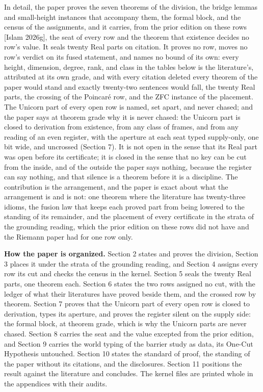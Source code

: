 \documentclass[10pt]{article}
\begin{document}
In detail, the paper proves the seven theorems of the division, the
bridge lemmas and small-height instances that accompany them, the formal
block, and the census of the assignments, and it carries, from the prior
edition on these rows {[}Islam 2026g{]}, the seat of every row and the
theorem that existence decides no row's value. It seals twenty Real
parts on citation. It proves no row, moves no row's verdict on its fused
statement, and names no bound of its own: every height, dimension,
degree, rank, and class in the tables below is the literature's,
attributed at its own grade, and with every citation deleted every
theorem of the paper would stand and exactly twenty-two sentences would
fall, the twenty Real parts, the crossing of the Poincaré row, and the
ZFC instance of the placement. The Unicorn part of every open row is
named, set apart, and never chased; and the paper says at theorem grade
why it is never chased: the Unicorn part is closed to derivation from
existence, from any class of frames, and from any reading of an even
register, with the aperture at each seat typed supply-only, one bit
wide, and uncrossed (Section 7). It is not open in the sense that its
Real part was open before its certificate; it is closed in the sense
that no key can be cut from the inside, and of the outside the paper
says nothing, because the register can say nothing, and that silence is
a theorem before it is a discipline. The contribution is the
arrangement, and the paper is exact about what the arrangement is and is
not: one theorem where the literature has twenty-three idioms, the
fusion law that keeps each proved part from being lowered to the
standing of its remainder, and the placement of every certificate in the
strata of the grounding reading, which the prior edition on these rows
did not have and the Riemann paper had for one row only.

\textbf{How the paper is organized.} Section 2 states and proves the
division, Section 3 places it under the strata of the grounding reading,
and Section 4 assigns every row its cut and checks the census in the
kernel. Section 5 seals the twenty Real parts, one theorem each. Section
6 states the two rows assigned no cut, with the ledger of what their
literatures have proved beside them, and the crossed row by theorem.
Section 7 proves that the Unicorn part of every open row is closed to
derivation, types its aperture, and proves the register silent on the
supply side: the formal block, at theorem grade, which is why the
Unicorn parts are never chased. Section 8 carries the seat and the value
excepted from the prior edition, and Section 9 carries the world typing
of the barrier study as data, its One-Cut Hypothesis untouched. Section
10 states the standard of proof, the standing of the paper without its
citations, and the disclosures. Section 11 positions the result against
the literature and concludes. The kernel files are printed whole in the
appendices with their audits.
\end{document}
